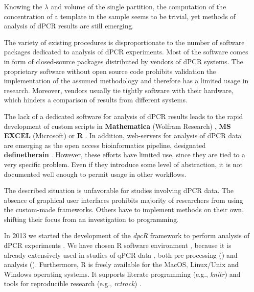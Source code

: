 \documentclass[a4,center,fleqn]{NAR}
\begin{document}
Knowing the $\lambda$ and volume of the single partition, the computation of 
the concentration of a template in the sample seems to be trivial, yet methods 
of analysis of dPCR results are still emerging.

The variety of existing procedures is disproportionate to the number of 
software packages dedicated to analysis of dPCR experiments. Most of the 
software comes in form of closed-source packages distributed by vendors of dPCR 
systems. The proprietary software without open source code prohibits validation 
the implementation of the assumed methodology and therefore has a limited usage 
in research. Moreover, vendors usually tie tightly software with their 
hardware, which hinders a comparison of results from different systems.

The lack of a dedicated software for analysis of dPCR results leads to the rapid 
development of custom scripts in \textbf{Mathematica} (Wolfram Research) 
\cite{strain_highly_2013}, \textbf{MS EXCEL} (Microsoft) 
\cite{dobnik_multiplex_2015} or \textbf{R} \cite{trypsteen_ddpcrquant_2015, 
dreo_optimising_2014}. In addition, web-servers for analysis of dPCR data are 
emerging as the open access bioinformatics pipeline, designated 
\textbf{definetherain} \cite{jones_low_2014}. However, these efforts have 
limited use, since they are tied to a very specific problem. Even if they 
introduce some level of abstraction, it is not documented well enough to 
permit usage in other workflows.

The described situation is unfavorable for studies involving dPCR data. The 
absence of graphical user interfaces prohibits majority of researchers from 
using the custom-made frameworks. Others have to implement methods on their own, 
shifting their focus from an investigation to programming. 

In 2013 we started the development of the \textit{dpcR} framework to perform 
analysis of dPCR experiments \cite{burdukiewicz_dpcr:_2013}. We have chosen R 
software environment \cite{Rcitation}, because it is already extensively used 
in studies of qPCR data \cite{pabinger_survey_2014, rodiger_r_2015}, both 
pre-processing (\cite{roediger2015chippcr, perkins_readqpcr_2012}) and 
analysis (\cite{rodiger_surface_2013, ritz_qpcr_2008}). Furthermore, R is 
freely available for the MacOS, Linux/Unix and Windows operating systems. It 
supports literate programming (e.g., \textit{knitr}) and tools for reproducible 
research (e.g., \textit{rctrack}) \cite{liu_r_2014}. 
\end{document}
